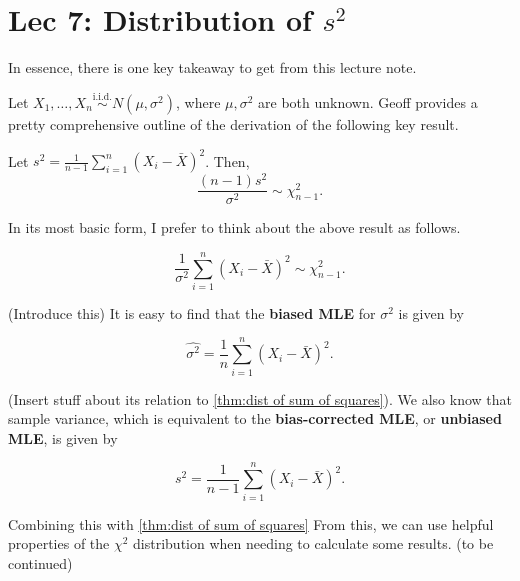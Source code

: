 \chapter[Lec 7: Distribution of s squared]{Lec 7: Distribution of \(s^2\)}\label{ch:Lec 7:dist of s squared}

In essence, there is one key takeaway to get from this lecture note.

\medskip 

Let \(X_1,\ldots,X_n \overset{\text{i.i.d.}}{\sim} N(\mu,\sigma^2)\), where \(\mu, \sigma^2\) are both unknown. 
Geoff provides a pretty comprehensive outline of the derivation of the following key result. 

\begin{theorem}\label{thm:dist of sample var}
    Let \(s^2 = \frac{1}{n-1}\sum_{i=1}^{n}{(X_i - \bar{X})}^2\). Then, 
    \[\frac{(n-1)s^2}{\sigma^2} \sim \chi_{n-1}^{2}.\]
\end{theorem}

In its most basic form, I prefer to think about the above result as follows. 

\begin{theorem}\label{thm:dist of sum of squares}
    \[\frac{1}{\sigma^2}\sum_{i=1}^{n}{(X_i - \bar{X})}^2 \sim \chi_{n-1}^{2}.\]
\end{theorem}

(Introduce this)
It is easy to find that the \textbf{biased MLE} for \(\sigma^2\) is given by 

\begin{equation}\label{eq:biased MLE var}
    \hat{\sigma^2} = \frac{1}{n}\sum_{i=1}^{n}{(X_i - \bar{X})}^2.
\end{equation}

(Insert stuff about its relation to \cref{thm:dist of sum of squares}).
We also know that sample variance, which is equivalent to the \textbf{bias-corrected MLE}, or \textbf{unbiased MLE}, is given by 

\begin{equation}\label{eq:unbiased MLE var}
    s^2 = \frac{1}{n-1}\sum_{i=1}^{n}{(X_i - \bar{X})}^2.
\end{equation}

Combining this with \cref{thm:dist of sum of squares}
From this, we can use helpful properties of the \(\chi^2\) distribution when needing to calculate some results. 
(to be continued)